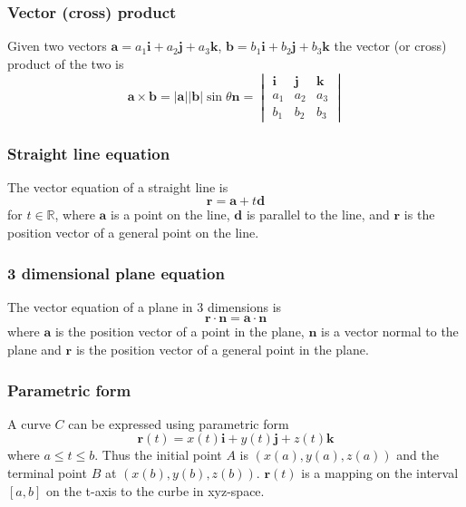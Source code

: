\documentclass[12pt]{article}
\begin{document}
		\subsubsection{Vector (cross) product}
		\begin{defn}
			Given two vectors $\mathbf{a} = a_1 \mathbf{i} + a_2 \mathbf{j} + a_3 \mathbf{k}$,
			$\mathbf{b} = b_1 \mathbf{i} + b_2 \mathbf{j} + b_3 \mathbf{k}$ the vector (or cross) product of the two is
			\[
				\mathbf{a} \times \mathbf{b} = |\mathbf{a}||\mathbf{b}|\sin{\theta}\mathbf{n} =
				\begin{vmatrix}
					\mathbf{i} & \mathbf{j} & \mathbf{k} \\
					a_1 & a_2 & a_3 \\
					b_1 & b_2 & b_3 
				\end{vmatrix} 
			\]
		\end{defn}
		
		\subsubsection{Straight line equation}
		\begin{defn}
			The vector equation of a straight line is
			\[
				\mathbf{r} = \mathbf{a} + t \mathbf{d}
			\]
			for $t \in \mathbb{R}$, where $\mathbf{a}$ is a point on the line, $\mathbf{d}$ is parallel to the line, 
			and $\mathbf{r}$ is the position vector of a general point on the line.
		\end{defn}
		
		\subsubsection{3 dimensional plane equation}
		\begin{defn}
			The vector equation of a plane in 3 dimensions is
			\[
				\mathbf{r} \cdot \mathbf{n} = \mathbf{a} \cdot \mathbf{n}
			\]
			where $\mathbf{a}$ is the position vector of a point in the plane, $\mathbf{n}$ is a vector normal to
			the plane and $\mathbf{r}$ is the position vector of a general point in the plane.
		\end{defn}
		
		\subsubsection{Parametric form}
		A curve $C$ can be expressed using parametric form
		\[
			\mathbf{r}(t) = x(t)\mathbf{i} + y(t)\mathbf{j} + z(t)\mathbf{k}
		\]
		where $a \leq t \leq b$. Thus the initial point $A$ is $(x(a),y(a),z(a))$ and the terminal point $B$ at $(x(b),y(b),z(b))$.
		$\mathbf{r}(t)$ is a mapping on the interval $[a,b]$ on the t-axis to the curbe in xyz-space.
		
\end{document}
